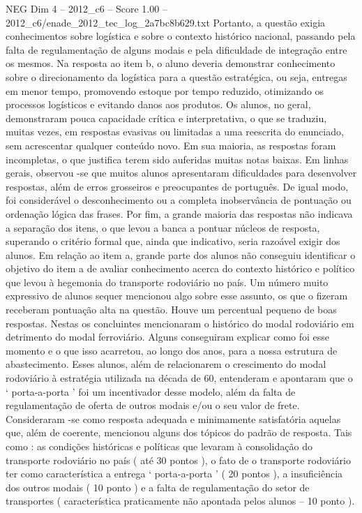 \begin{textsample}{NEG Dim 4 – 2012\_c6 – Score 1.00 – 2012\_c6/enade\_2012\_tec\_log\_2a7bc8b629.txt}
Portanto, a questão exigia conhecimentos sobre logística e sobre o contexto histórico nacional, passando pela falta de regulamentação de alguns modais e pela dificuldade de integração entre os mesmos.
Na resposta ao item b, o aluno deveria demonstrar conhecimento sobre o direcionamento da logística para a questão estratégica, ou seja, entregas em menor tempo, promovendo estoque por tempo reduzido, otimizando os processos logísticos e evitando danos aos produtos.
Os alunos, no geral, demonstraram pouca capacidade crítica e interpretativa, o que se traduziu, muitas vezes, em respostas evasivas ou limitadas a uma reescrita do enunciado, sem acrescentar qualquer conteúdo novo.
Em sua maioria, as respostas foram incompletas, o que justifica terem sido auferidas muitas notas baixas.
Em linhas gerais, observou -se que muitos alunos apresentaram dificuldades para desenvolver respostas, além de erros grosseiros e preocupantes de português.
De igual modo, foi considerável o desconhecimento ou a completa inobservância de pontuação ou ordenação lógica das frases.
Por fim, a grande maioria das respostas não indicava a separação dos itens, o que levou a banca a pontuar núcleos de resposta, superando o critério formal que, ainda que indicativo, seria razoável exigir dos alunos.
Em relação ao item a, grande parte dos alunos não conseguiu identificar o objetivo do item a de avaliar conhecimento acerca do contexto histórico e político que levou à hegemonia do transporte rodoviário no país.
Um número muito expressivo de alunos sequer mencionou algo sobre esse assunto, os que o fizeram receberam pontuação alta na questão.
Houve um percentual pequeno de boas respostas.
Nestas os concluintes mencionaram o histórico do modal rodoviário em detrimento do modal ferroviário.
Alguns conseguiram explicar como foi esse momento e o que isso acarretou, ao longo dos anos, para a nossa estrutura de abastecimento.
Esses alunos, além de relacionarem o crescimento do modal rodoviário à estratégia utilizada na década de 60, entenderam e apontaram que o ‘ porta-a-porta ’ foi um incentivador desse modelo, além da falta de regulamentação de oferta de outros modais e/ou o seu valor de frete.
Consideraram -se como resposta adequada e minimamente satisfatória aquelas que, além de coerente, mencionou alguns dos tópicos do padrão de resposta.
Tais como : as condições históricas e políticas que levaram à consolidação do transporte rodoviário no país ( até 30 pontos ), o fato de o transporte rodoviário ter como característica a entrega ‘ porta-a-porta ’ ( 20 pontos ), a insuficiência dos outros modais ( 10 ponto ) e a falta de regulamentação do setor de transportes ( característica praticamente não apontada pelos alunos – 10 ponto ).

\end{textsample}
